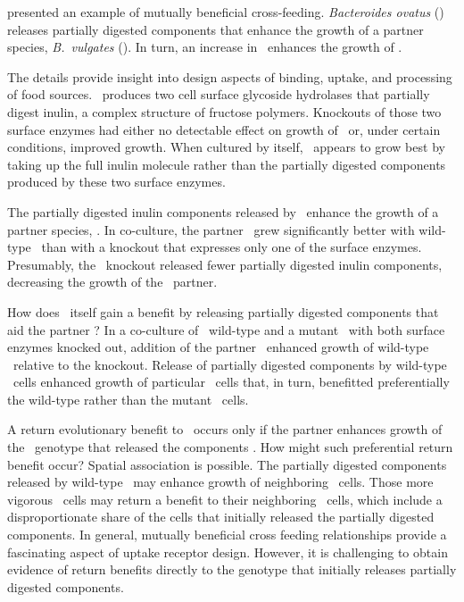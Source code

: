 \documentclass[\mydocfontsize]{article}
\begin{document}
\begin{multicols}{2}
\textcite{rakoff-nahoum16the-evolution} presented an example of mutually beneficial cross-feeding. \textit{Bacteroides ovatus} (\Bo) releases partially digested components that enhance the growth of a partner species, \textit{B.\ vulgates} (\Bv). In turn, an increase in \Bv\ enhances the growth of \Bo. 

The details provide insight into design aspects of binding, uptake, and processing of food sources. \Bo\ produces two cell surface glycoside hydrolases that partially digest inulin, a complex structure of fructose polymers. Knockouts of those two surface enzymes had either no detectable effect on growth of \Bo\ or, under certain conditions, improved growth. When cultured by itself, \Bo\ appears to grow best by taking up the full inulin molecule rather than the partially digested components produced by these two surface enzymes.  

The partially digested inulin components released by \Bo\ enhance the growth of a partner species, \Bv. In co-culture, the partner \Bv\ grew significantly better with wild-type \Bo\ than with a knockout that expresses only one of the surface enzymes. Presumably, the \Bo\ knockout released fewer partially digested inulin components, decreasing the growth of the \Bv\ partner. 

How does \Bo\ itself gain a benefit by releasing partially digested components that aid the partner \Bv? In a co-culture of \Bo\ wild-type and a mutant \Bo\ with both surface enzymes knocked out, addition of the partner \Bv\ enhanced growth of wild-type \Bo\ relative to the knockout. Release of partially digested components by wild-type \Bo\ cells enhanced growth of particular \Bv\ cells that, in turn, benefitted preferentially the wild-type rather than the mutant \Bo\ cells. 

A return evolutionary benefit to \Bo\ occurs only if the partner enhances growth of the \Bo\ genotype that released the components \autocite{frank94genetics}. How might such preferential return benefit occur? Spatial association is possible. The partially digested components released by wild-type \Bo\ may enhance growth of neighboring \Bv\ cells. Those more vigorous \Bv\ cells may return a benefit to their neighboring \Bo\ cells, which include a disproportionate share of the cells that initially released the partially digested components. In general, mutually beneficial cross feeding relationships provide a fascinating aspect of uptake receptor design. However, it is challenging to obtain evidence of return benefits directly to the genotype that initially releases partially digested components. 


\end{multicols}
\end{document}
